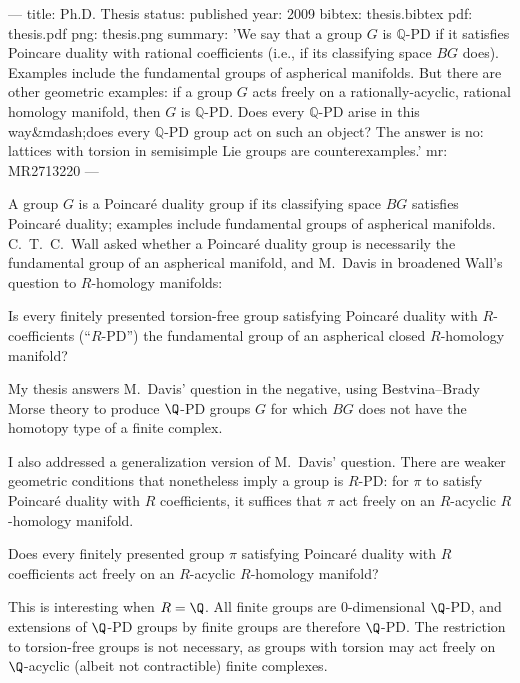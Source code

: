 ---
title: Ph.D. Thesis
status: published
year: 2009
bibtex: thesis.bibtex
pdf: thesis.pdf
png: thesis.png
summary: 'We say that a group $G$ is $\mathbb{Q}$-$\mathrm{PD}$ if it satisfies Poincare duality with rational coefficients (i.e., if its classifying space $BG$ does).  Examples include the fundamental groups of aspherical manifolds. But there are other geometric examples: if a group $G$ acts freely on a rationally-acyclic, rational homology manifold, then $G$ is $\mathbb{Q}$-$\mathrm{PD}$.  Does every $\mathbb{Q}$-$\mathrm{PD}$ arise in this way&mdash;does every $\mathbb{Q}$-$\mathrm{PD}$ group act on such an object? The answer is no: lattices with torsion in semisimple Lie groups are counterexamples.'
mr: MR2713220
---

A group $G$ is a Poincar\'e duality group if its classifying space $BG$ satisfies Poincar\'e duality; examples include fundamental groups of aspherical manifolds.  C.~T.~C.~Wall asked whether a Poincar\'e duality group is necessarily the fundamental group of an aspherical manifold, and M.~Davis in \cite{MR1747535} broadened Wall's question to $R$-homology manifolds:
  \begin{question}[M.~Davis]
  Is every finitely presented torsion-free group satisfying Poincar\'e
  duality with $R$-coefficients (``$R$-PD'') the fundamental group of an
  aspherical closed $R$-homology manifold?
  \end{question}
My thesis answers M.~Davis' question in the negative, using Bestvina--Brady Morse theory to produce $\Q$-PD groups $G$ for which $BG$ does not have the homotopy type of a finite complex.

  I also addressed a generalization version of M.~Davis' question. There are weaker geometric conditions that nonetheless imply a group is $R$-PD: for $\pi$ to satisfy Poincar\'e duality with $R$ coefficients, it suffices that $\pi$ act freely on an $R$-acyclic $R$-homology manifold.
  \begin{question}
    Does every finitely presented group $\pi$ satisfying Poincar\'e duality with $R$ coefficients act freely on an $R$-acyclic $R$-homology manifold?
  \end{question}
  This is interesting when $R = \Q$.  All finite groups are $0$-dimensional $\Q$-PD, and extensions of $\Q$-PD groups by finite groups are therefore $\Q$-PD.  The restriction to torsion-free groups is not necessary, as groups with torsion may act freely on $\Q$-acyclic (albeit not contractible) finite complexes.

